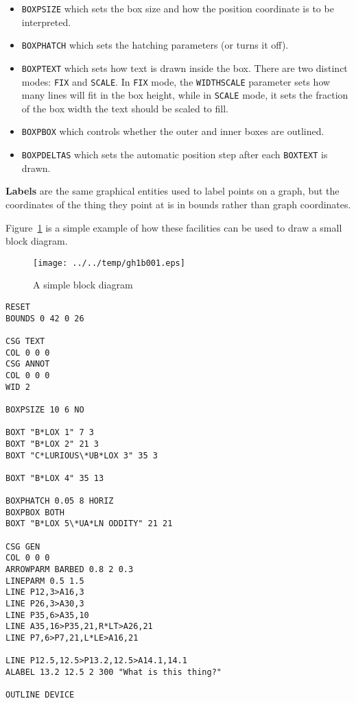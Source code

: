 \documentclass[a4paper,twoside,11pt]{article}
\makeatletter
\def\maxwidth{%
  \ifdim\Gin@nat@width>\linewidth
    \linewidth
  \else
    \Gin@nat@width
  \fi
}
\newcommand{\newpara}{\par\vspace{4mm}\noindent}
\makeatother
\begin{document}
\begin{itemize}
\item
  \texttt{BOXPSIZE} which sets the box size and how the position
  coordinate is to be interpreted.
\item
  \texttt{BOXPHATCH} which sets the hatching parameters (or turns it
  off).
\item
  \texttt{BOXPTEXT} which sets how text is drawn inside the box. There
  are two distinct modes: \texttt{FIX} and \texttt{SCALE}. In
  \texttt{FIX} mode, the \texttt{WIDTHSCALE} parameter sets how many
  lines will fit in the box height, while in \texttt{SCALE} mode, it
  sets the fraction of the box width the text should be scaled to fill.
\item
  \texttt{BOXPBOX} which controls whether the outer and inner boxes are
  outlined.
\item
  \texttt{BOXPDELTAS} which sets the automatic position step after each
  \texttt{BOXTEXT} is drawn.
\end{itemize}

\newpara
\textbf{Labels} are the same graphical entities used to label points on
a graph, but the coordinates of the thing they point at is in bounds
rather than graph coordinates.

\newpara
Figure~\ref{fig:gh1b001} is a simple example of how
these facilities can be used to draw a
small block diagram.

\begin{figure}
  \centering
  \texttt{[image: ../../temp/gh1b001.eps]}
  \caption{A simple block diagram}
  \label{fig:gh1b001}
\end{figure}

\begin{lstlisting}
RESET
BOUNDS 0 42 0 26

CSG TEXT
COL 0 0 0
CSG ANNOT
COL 0 0 0
WID 2

BOXPSIZE 10 6 NO

BOXT "B*LOX 1" 7 3
BOXT "B*LOX 2" 21 3
BOXT "C*LURIOUS\*UB*LOX 3" 35 3

BOXT "B*LOX 4" 35 13

BOXPHATCH 0.05 8 HORIZ
BOXPBOX BOTH
BOXT "B*LOX 5\*UA*LN ODDITY" 21 21

CSG GEN
COL 0 0 0
ARROWPARM BARBED 0.8 2 0.3
LINEPARM 0.5 1.5
LINE P12,3>A16,3
LINE P26,3>A30,3
LINE P35,6>A35,10
LINE A35,16>P35,21,R*LT>A26,21
LINE P7,6>P7,21,L*LE>A16,21

LINE P12.5,12.5>P13.2,12.5>A14.1,14.1
ALABEL 13.2 12.5 2 300 "What is this thing?"

OUTLINE DEVICE
\end{lstlisting}
\end{document}
